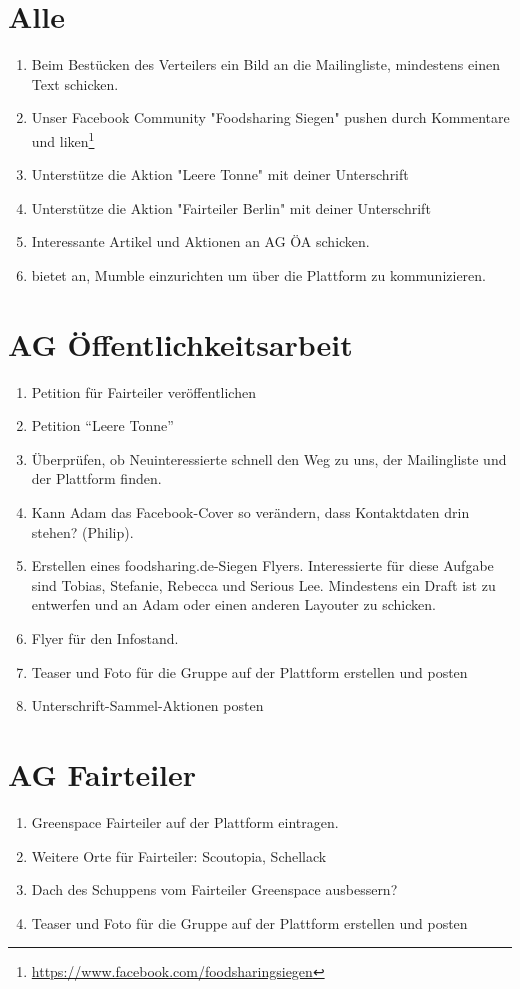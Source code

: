 \documentclass{scrreprt}
\begin{document}
    \section{Alle}
    \begin{enumerate}
    	\item Beim Bestücken des Verteilers ein Bild an die Mailingliste, mindestens einen Text schicken.
		\item Unser Facebook Community "Foodsharing Siegen" pushen durch Kommentare und liken\footnote{\url{https://www.facebook.com/foodsharingsiegen}}
		\item Unterstütze die Aktion "Leere Tonne" mit deiner Unterschrift
		\item Unterstütze die Aktion "Fairteiler Berlin" mit deiner Unterschrift
		\item Interessante Artikel und Aktionen an AG ÖA schicken.
    	\item bietet an, Mumble einzurichten um über die Plattform zu kommunizieren.
    \end{enumerate}
    \section{AG Öffentlichkeitsarbeit}
    \begin{enumerate}
    	\item Petition für Fairteiler veröffentlichen
    	\item Petition \enquote{Leere Tonne}
    	\item Überprüfen, ob Neuinteressierte schnell den Weg zu uns, der Mailingliste und der Plattform finden.
    	\item Kann Adam das Facebook-Cover so verändern, dass Kontaktdaten drin stehen? (Philip).  
    	\item Erstellen eines foodsharing.de-Siegen Flyers. Interessierte für diese Aufgabe sind Tobias, Stefanie, Rebecca und Serious Lee. Mindestens ein Draft ist zu entwerfen und an Adam oder einen anderen Layouter zu schicken. 
    	\item Flyer für den Infostand.
    	\item Teaser und Foto für die Gruppe auf der Plattform erstellen und posten
    	\item Unterschrift-Sammel-Aktionen posten
    \end{enumerate}
    \section{AG Fairteiler}
    \begin{enumerate}
    	\item Greenspace Fairteiler auf der Plattform eintragen.
    	\item Weitere Orte für Fairteiler: Scoutopia, Schellack
    	\item Dach des Schuppens vom Fairteiler Greenspace ausbessern?
      	\item Teaser und Foto für die Gruppe auf der Plattform erstellen und posten
    \end{enumerate}
\end{document}
